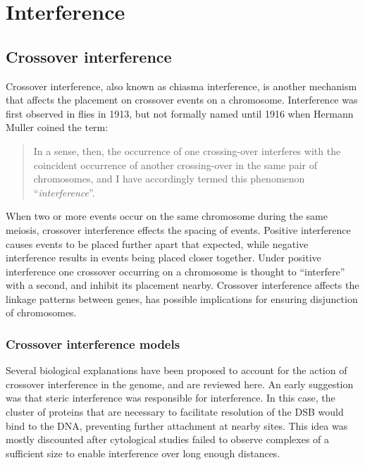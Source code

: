 \section{Interference}

\subsection{Crossover interference}

Crossover interference, also known as chiasma interference, is another mechanism that affects the placement on crossover events on a chromosome.
Interference was first observed in flies in 1913\cite{Sturtevant1913}, but not formally named until 1916 when Hermann Muller coined the term:
\begin{quote}
    In a sense, then, the occurrence of one crossing-over interferes with the coincident occurrence of another crossing-over in the same pair of chromosomes, and I have accordingly termed this phenomenon ``\textit{interference}''.
\end{quote}
%
When two or more events occur on the same chromosome during the same meiosis, crossover interference effects the spacing of events.
Positive interference causes events to be placed further apart that expected, while negative interference results in events being placed closer together.
Under positive interference one crossover occurring on a chromosome is thought to ``interfere'' with a second, and inhibit its placement nearby.
Crossover interference affects the linkage patterns between genes, has possible implications for ensuring disjunction of chromosomes.




\subsubsection{Crossover interference models}

Several biological explanations have been proposed to account for the action of crossover interference in the genome, and are reviewed here.
An early suggestion was that steric interference was responsible for interference.
In this case, the cluster of proteins that are necessary to facilitate resolution of the DSB would bind to the DNA, preventing further attachment at nearby sites.
This idea was mostly discounted after cytological studies failed to observe complexes of a sufficient size to enable interference over long enough distances.

